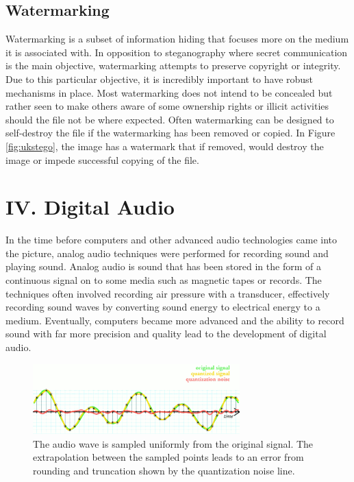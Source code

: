 \documentclass[letterpaper]{article}
\begin{document}
\subsection{Watermarking}
Watermarking is a subset of information hiding that focuses more on the medium it is associated with. In opposition to steganography where secret communication is the main objective, watermarking attempts to preserve copyright or integrity. Due to this particular objective, it is incredibly important to have robust mechanisms in place. Most watermarking does not intend to be concealed but rather seen to make others aware of some ownership rights or illicit activities should the file not be where expected. Often watermarking can be designed to self-destroy the file if the watermarking has been removed or copied. In Figure \ref{fig:ukstego}, the image has a watermark that if removed, would destroy the image or impede successful copying of the file. \cite{ukstego}



\section{IV. Digital Audio}
In the time before computers and other advanced audio technologies came into the picture, analog audio techniques were performed for recording sound and playing sound. Analog audio is sound that has been stored in the form of a continuous signal on to some media such as magnetic tapes or records. The techniques often involved recording air pressure with a transducer, effectively recording sound waves by converting sound energy to electrical energy to a medium. Eventually, computers became more advanced and the ability to record sound with far more precision and quality lead to the development of digital audio. 
 
\begin{figure}[h]
    \centering
    \includegraphics[width=8cm]{images/quanterrr.png}
    \caption{The audio wave is sampled uniformly from the original signal. The extrapolation between the sampled points leads to an error from rounding and truncation shown by the quantization noise line.}
    \label{fig:quanterr}
\end{figure}
\end{document}
